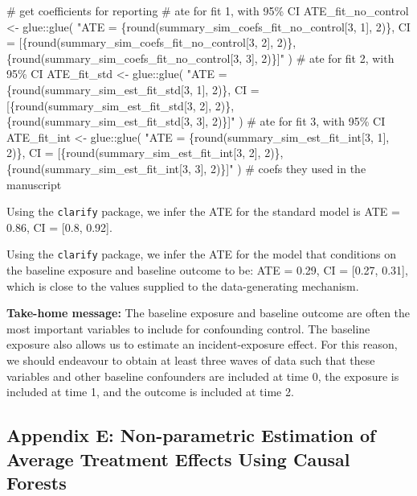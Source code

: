 \documentclass[
  singlecolumn]{article}
\newenvironment{Shaded}{}{}
\newcommand{\CommentTok}[1]{\textcolor[rgb]{0.42,0.45,0.49}{#1}}
\newcommand{\FunctionTok}[1]{\textcolor[rgb]{0.44,0.26,0.76}{#1}}
\newcommand{\NormalTok}[1]{\textcolor[rgb]{0.14,0.16,0.18}{#1}}
\newcommand{\OtherTok}[1]{\textcolor[rgb]{0.44,0.26,0.76}{#1}}
\newcommand{\SpecialCharTok}[1]{\textcolor[rgb]{0.00,0.36,0.77}{#1}}
\newcommand{\StringTok}[1]{\textcolor[rgb]{0.01,0.18,0.38}{#1}}
\begin{document}
\begin{Shaded}
\begin{Highlighting}[]
\CommentTok{\# get coefficients for reporting}
\CommentTok{\# ate for fit 1, with 95\% CI}
\NormalTok{ATE\_fit\_no\_control  }\OtherTok{\textless{}{-}}\NormalTok{ glue}\SpecialCharTok{::}\FunctionTok{glue}\NormalTok{(}
  \StringTok{"ATE = \{round(summary\_sim\_coefs\_fit\_no\_control[3, 1], 2)\}, }
\StringTok{  CI = [\{round(summary\_sim\_coefs\_fit\_no\_control[3, 2], 2)\},}
\StringTok{  \{round(summary\_sim\_coefs\_fit\_no\_control[3, 3], 2)\}]"}
\NormalTok{)}
\CommentTok{\# ate for fit 2, with 95\% CI}
\NormalTok{ATE\_fit\_std }\OtherTok{\textless{}{-}}\NormalTok{ glue}\SpecialCharTok{::}\FunctionTok{glue}\NormalTok{(}
  \StringTok{"ATE = \{round(summary\_sim\_est\_fit\_std[3, 1], 2)\}, }
\StringTok{  CI = [\{round(summary\_sim\_est\_fit\_std[3, 2], 2)\},}
\StringTok{  \{round(summary\_sim\_est\_fit\_std[3, 3], 2)\}]"}
\NormalTok{)}
\CommentTok{\# ate for fit 3, with 95\% CI}
\NormalTok{ATE\_fit\_int }\OtherTok{\textless{}{-}}
\NormalTok{  glue}\SpecialCharTok{::}\FunctionTok{glue}\NormalTok{(}
    \StringTok{"ATE = \{round(summary\_sim\_est\_fit\_int[3, 1], 2)\},}
\StringTok{    CI = [\{round(summary\_sim\_est\_fit\_int[3, 2], 2)\},}
\StringTok{    \{round(summary\_sim\_est\_fit\_int[3, 3], 2)\}]"}
\NormalTok{  )}
\CommentTok{\# coefs they used in the manuscript}
\end{Highlighting}
\end{Shaded}

Using the \texttt{clarify} package, we infer the ATE for the standard
model is ATE = 0.86, CI = {[}0.8, 0.92{]}.

Using the \texttt{clarify} package, we infer the ATE for the model that
conditions on the baseline exposure and baseline outcome to be: ATE =
0.29, CI = {[}0.27, 0.31{]}, which is close to the values supplied to
the data-generating mechanism.

\textbf{Take-home message:} The baseline exposure and baseline outcome
are often the most important variables to include for confounding
control. The baseline exposure also allows us to estimate an
incident-exposure effect. For this reason, we should endeavour to obtain
at least three waves of data such that these variables and other
baseline confounders are included at time 0, the exposure is included at
time 1, and the outcome is included at time 2.

\newpage{}

\subsection{Appendix E: Non-parametric Estimation of Average Treatment
Effects Using Causal Forests}\label{appendix-causal-forests}
\end{document}

